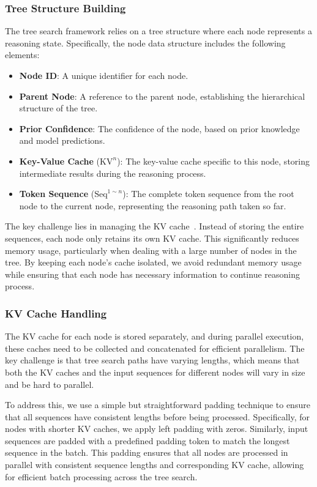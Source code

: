 \subsubsection{Tree Structure Building}
The tree search framework relies on a tree structure where each node represents a reasoning state.  Specifically, the node data structure includes the following elements:
\begin{itemize}[itemsep=0pt,parsep=0pt,left=0pt,topsep=0pt]
    \item \textbf{Node ID}: A unique identifier for each node.
    \item \textbf{Parent Node}: A reference to the parent node, establishing the hierarchical structure of the tree.
    \item \textbf{Prior Confidence}: The confidence of the node, based on prior knowledge and model predictions.
    \item \textbf{Key-Value Cache} (\(\text{KV}^n\)): The key-value cache specific to this node, storing intermediate results during the reasoning process.
    \item \textbf{Token Sequence} (\(\text{Seq}^{1 \sim n}\)): The complete token sequence from the root node to the current node, representing the reasoning path taken so far.
\end{itemize}
The key challenge lies in managing the KV cache~\cite{floridi2020gpt}. Instead of storing the entire sequences, each node only retains its own KV cache. This significantly reduces memory usage, particularly when dealing with a large number of nodes in the tree. By keeping each node's cache isolated, we avoid redundant memory usage while ensuring that each node has necessary information to continue reasoning process.

\subsubsection{KV Cache Handling}

The KV cache for each node is stored separately, and during parallel execution, these caches need to be collected and concatenated for efficient parallelism. The key challenge is that tree search paths have varying lengths, which means that both the KV caches and the input sequences for different nodes will vary in size and be hard to parallel. 

To address this, we use a simple but straightforward padding technique to ensure that all sequences have consistent lengths before being processed. Specifically, for nodes with shorter KV caches, we apply left padding with zeros. Similarly, input sequences are padded with a predefined padding token to match the longest sequence in the batch. 
This padding ensures that all nodes are processed in parallel with consistent sequence lengths and corresponding KV cache, allowing for efficient batch processing across the tree search. 

